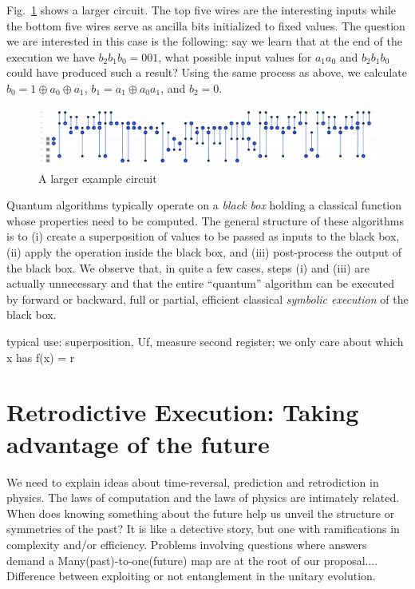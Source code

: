 \documentclass{article}
\begin{document}
Fig.~\ref{fig:adder} shows a larger circuit. The top five wires are the interesting inputs while the bottom five wires serve as ancilla bits initialized to fixed values. The question we are interested in this case is the following: say we learn that at the end of the execution we have $b_2b_1b_0 = 001$, what possible input values for $a_1a_0$ and $b_2b_1b_0$ could have produced such a result? Using the same process as above, we calculate $b_0 = 1 \oplus a_0 \oplus a_1$, $b_1 = a_1 \oplus a_0a_1$, and $b_2 = 0$.

\begin{figure}[t]
    \centering
    \includegraphics[scale=0.2]{adder.pdf}
    \caption{A larger example circuit}
    \label{fig:adder}
\end{figure}



Quantum algorithms typically operate on a \emph{black box} holding a classical function whose properties need to be computed. The general structure of these algorithms is to (i) create a superposition of values to be passed as inputs to the black box, (ii) apply the operation inside the black box, and (iii) post-process the output of the black box. We observe that, in quite a few cases, steps (i) and (iii) are actually unnecessary and that the entire ``quantum'' algorithm can be executed by forward or backward, full or partial, efficient classical \emph{symbolic execution} of the black box. 


typical use: superposition, Uf, measure second register; we only care about which x has f(x) = r

\section{Retrodictive Execution: Taking advantage of the future}

We need to explain ideas about time-reversal, prediction and retrodiction in 
physics. The laws of computation and the laws of physics are intimately related. 
When does knowing something about the future help us unveil the structure or 
symmetries of the past? It is like a detective story, but one with 
ramifications in complexity and/or efficiency. Problems involving questions 
where answers demand a Many(past)-to-one(future) map are at the root of 
our proposal.... {\color{red} Difference between exploiting or not entanglement
in the unitary evolution.}
\end{document}
